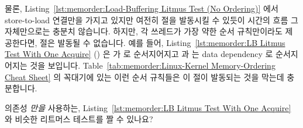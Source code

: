 물론,
Listing~\ref{lst:memorder:Load-Buffering Litmus Test (No Ordering)}
에서 store-to-load 연결만을 가지고 있지만 여전히  절을 발동시킬 수
있듯이 시간의 흐름 그 자체만으로는 충분치 않습니다.
하지만, 각 쓰레드가 가장 약한 순서 규칙만이라도 제공한다면,  절은
발동될 수 없습니다.
예를 들어,
Listing~\ref{lst:memorder:LB Litmus Test With One Acquire}
()
은  가  로 순서지어지고  과 
는 data dependency 로 순서지어지는 것을 보입니다.
Table~\ref{tab:memorder:Linux-Kernel Memory-Ordering Cheat Sheet}
의 꼭대기에 있는 이런 순서 규칙들은 이  절이 발동되는 것을 막는데
충분합니다.

\QuickQuiz{}
	의존성 \emph{만을} 사용하는,
	Listing~\ref{lst:memorder:LB Litmus Test With One Acquire}
	와 비슷한 리트머스 테스트를 짤 수 있나요?
	\iffalse

